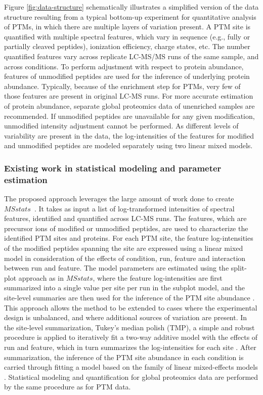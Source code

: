 \documentclass[mcp]{article}
\numberwithin{table}{section}
\begin{document}
Figure \ref{fig:data-structure} schematically illustrates a simplified version of the data structure resulting from a typical bottom-up experiment for quantitative analysis of PTMs, in which there are multiple layers of variation present. A PTM site is quantified with multiple spectral features, which vary in sequence (e.g., fully or partially cleaved peptides), ionization efficiency, charge states, etc. The number quantified features vary across replicate LC-MS/MS runs of the same sample, and across conditions. To perform adjustment with respect to protein abundance, features of unmodified peptides are used for the inference of underlying protein abundance. Typically, because of the enrichment step for PTMs, very few of those features are present in original LC-MS runs. For more accurate estimation of protein abundance, separate global proteomics data of unenriched samples are recommended. If unmodified peptides are unavailable for any given modification, unmodified intensity adjustment cannot be performed. As different levels of variability are present in the data, the log-intensities of the features for modified and unmodified peptides are modeled separately using two linear mixed models.

\subsubsection*{Existing work in statistical modeling and parameter estimation}

The proposed approach leverages the large amount of work done to create $MSstats$~\cite{Choi:2014}. It takes as input a list of log-transformed intensities of spectral features, identified and quantified across LC-MS runs. The features, which are precursor ions of modified or unmodified peptides, are used to characterize the identified PTM sites and proteins. For each PTM site, the feature log-intensities of the modified peptides spanning the site are expressed using a linear mixed model in consideration of the effects of condition, run, feature and interaction between run and feature. The model parameters are estimated using the split-plot approach as in $MSstats$, where the feature log-intensities are first summarized into a single value per site per run in the subplot model, and the site-level summaries are then used for the inference of the PTM site abundance \cite{Choi:2014}. This approach allows the method to be extended to cases where the experimental design is unbalanced, and where additional sources of variation are present. In the site-level summarization, Tukey's median polish (TMP), a simple and robust procedure is applied to iteratively fit a two-way additive model with the effects of run and feature, which in turn summarizes the log-intensities for each site \cite{Tukey:1977}. After summarization, the inference of the PTM site abundance in each condition is carried through fitting a model based on the family of linear mixed-effects models \cite{Bolker2009} \cite{Faraway:2006}. Statistical modeling and quantification for global proteomics data are performed by the same procedure as for PTM data.
\end{document}
